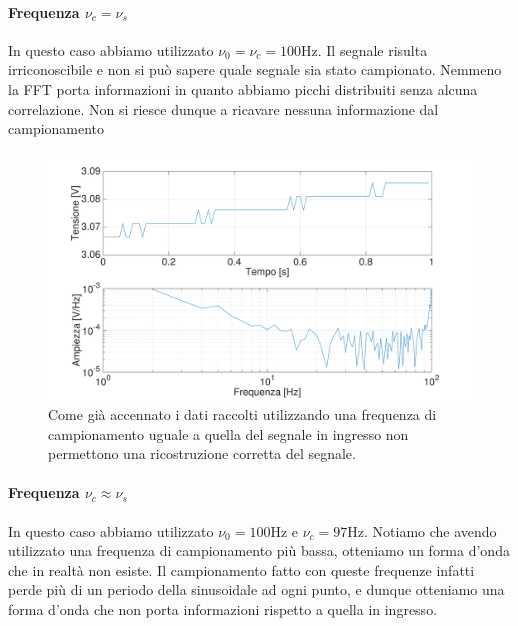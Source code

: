 \paragraph{Frequenza $\nu_c = \nu_s$ \newline}

In questo caso abbiamo utilizzato $\nu_0=\nu_c=100 \si{\hertz}$. Il segnale risulta irriconoscibile e non si può sapere quale segnale sia stato campionato. Nemmeno la FFT porta informazioni in quanto abbiamo picchi distribuiti senza alcuna correlazione. Non si riesce dunque a ricavare nessuna informazione dal campionamento

\begin{figure}[H]
\centering
	\includegraphics[width=.63\textwidth]{../E13/latex/sin100hz@100,100_2.pdf}
	\caption{Come già accennato i dati raccolti utilizzando una frequenza di campionamento uguale a quella del segnale in ingresso non permettono una ricostruzione corretta del segnale. }
	\label{sin2}
\end{figure}

\paragraph{Frequenza $\nu_c \approx \nu_s$ \newline}
In questo caso abbiamo utilizzato $\nu_0=100 \si{\hertz}$ e $\nu_c=97 \si{\hertz}$. Notiamo che avendo utilizzato una frequenza di campionamento più bassa, otteniamo un forma d'onda che in realtà non esiste. Il campionamento fatto con queste frequenze infatti perde più di un periodo della sinusoidale ad ogni punto, e dunque otteniamo una forma d'onda che non porta informazioni rispetto a quella in ingresso.

